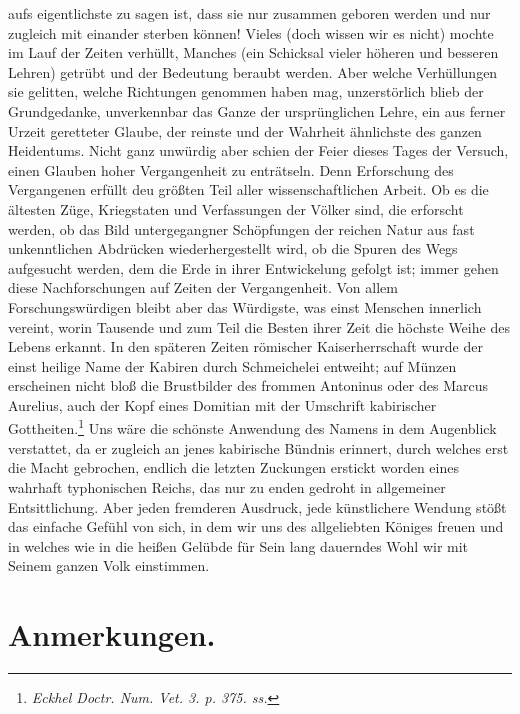 \documentclass[a4paper, 11pt, oneside]{article}
\begin{document}
aufs eigentlichste zu sagen ist, dass sie nur zusammen geboren werden und nur zugleich mit einander sterben können! Vieles (doch wissen wir es nicht) mochte im Lauf der Zeiten verhüllt, Manches (ein Schicksal vieler höheren und besseren Lehren) getrübt und der Bedeutung beraubt werden. Aber welche Verhüllungen sie gelitten, welche Richtungen genommen haben mag, unzerstörlich blieb der Grundgedanke, unverkennbar das Ganze der ursprünglichen Lehre, ein aus ferner Urzeit geretteter Glaube, der reinste und der Wahrheit ähnlichste des ganzen Heidentums. Nicht ganz unwürdig aber schien der Feier dieses Tages der Versuch, einen Glauben hoher Vergangenheit zu enträtseln. Denn Erforschung des Vergangenen erfüllt deu größten Teil aller wissenschaftlichen Arbeit. Ob es die ältesten Züge, Kriegstaten und Verfassungen der Völker sind, die erforscht werden, ob das Bild untergegangner Schöpfungen der reichen Natur aus fast unkenntlichen Abdrücken wiederhergestellt wird, ob die Spuren des Wegs aufgesucht werden, dem die Erde in ihrer Entwickelung gefolgt ist; immer gehen diese Nachforschungen auf Zeiten der Vergangenheit. Von allem Forschungswürdigen bleibt aber das Würdigste, was einst Menschen innerlich vereint, worin Tausende und zum Teil die Besten ihrer Zeit die höchste Weihe des Lebens erkannt. In den späteren Zeiten römischer Kaiserherrschaft wurde der einst heilige Name der Kabiren durch Schmeichelei entweiht; auf Münzen erscheinen nicht bloß die Brustbilder des frommen Antoninus oder des Marcus Aurelius, auch der Kopf eines Domitian mit der Umschrift kabirischer Gottheiten.\footnote{\emph{Eckhel Doctr. Num. Vet. 3. p. 375. ss.}} Uns wäre die schönste Anwendung des Namens in dem Augenblick verstattet, da er zugleich an jenes kabirische Bündnis erinnert, durch welches erst die Macht gebrochen, endlich die letzten Zuckungen erstickt worden eines wahrhaft typhonischen Reichs, das nur zu enden gedroht in allgemeiner Entsittlichung. Aber jeden fremderen Ausdruck, jede künstlichere Wendung stößt das einfache Gefühl von sich, in dem wir uns des allgeliebten Königes freuen und in welches wie in die heißen Gelübde für Sein lang dauerndes Wohl wir mit Seinem ganzen Volk einstimmen.
\clearpage
\section{Anmerkungen.}
\end{document}
